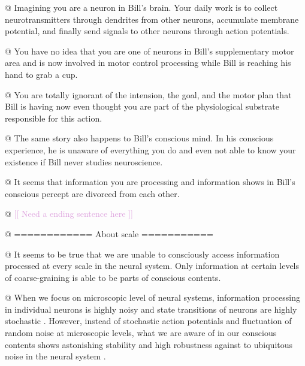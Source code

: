 \documentclass[utf8]{article}
\newenvironment{ants}
			{
			 \begin{easylist}[itemize]		
		 	}
			{
			\end{easylist}
			}
\newcommand{\idea}[2][Plum]{\noindent
				\textcolor{#1}{[[ #2 ]]}}
\begin{document}
	
		\begin{ants}
			
				@ Imagining you are a neuron in Bill's brain. Your daily work is to collect neurotransmitters through dendrites from other neurons, accumulate membrane potential, and finally send signals to other neurons through action potentials. 
				
				@ You have no idea that you are one of neurons in Bill's supplementary motor area and is now involved in motor control processing while Bill is reaching his hand to grab a cup. 
				
				@ You are totally ignorant of the intension, the goal, and the motor plan that Bill is having now even thought you are part of the physiological substrate responsible for this action. 
				
				@ The same story also happens to Bill's conscious mind. In his conscious experience, he is unaware of everything you do and even not able to know your existence if Bill never studies neuroscience.
				
				@ It seems that information you are processing and information shows in Bill's conscious percept are divorced from each other. 
				
				@ \idea{Need a ending sentence here}				
				
													
			
			
				@ ============ About scale ===========
				
				@ It seems to be true that we are unable to consciously access information processed at every scale in the neural system. Only information at certain levels of coarse-graining is able to be parts of conscious contents. 
				
				@ When we focus on microscopic level of neural systems, information processing in individual neurons is highly noisy and state transitions of neurons are highly stochastic \citep{Goldwyn2011, White2000}. However, instead of stochastic action potentials and fluctuation of random noise at microscopic levels, what we are aware of in our conscious contents shows astonishing stability and high robustness against to ubiquitous noise in the neural system \citep{mathis1995computational}.
				
				
			

\end{ants}
\end{document}
